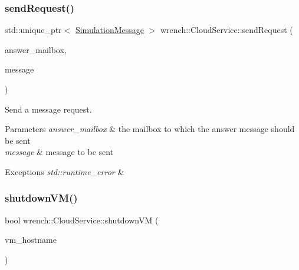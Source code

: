 \subsubsection{\texorpdfstring{send\+Request()}{sendRequest()}}
{\footnotesize\ttfamily std\+::unique\+\_\+ptr$<$ \hyperlink{classwrench_1_1_simulation_message}{Simulation\+Message} $>$ wrench\+::\+Cloud\+Service\+::send\+Request (\begin{DoxyParamCaption}\item[{std\+::string \&}]{answer\+\_\+mailbox,  }\item[{\hyperlink{classwrench_1_1_compute_service_message}{Compute\+Service\+Message} $\ast$}]{message }\end{DoxyParamCaption})\hspace{0.3cm}{\ttfamily [protected]}}



Send a message request. 


\begin{DoxyParams}{Parameters}
{\em answer\+\_\+mailbox} & the mailbox to which the answer message should be sent \\
\hline
{\em message} & message to be sent\\
\hline
\end{DoxyParams}

\begin{DoxyExceptions}{Exceptions}
{\em std\+::runtime\+\_\+error} & \\
\hline
\end{DoxyExceptions}
\mbox{\label{classwrench_1_1_cloud_service_ac9ee0c086c699c0c690be88abc7a0f9c}} 
\subsubsection{\texorpdfstring{shutdown\+V\+M()}{shutdownVM()}}
{\footnotesize\ttfamily bool wrench\+::\+Cloud\+Service\+::shutdown\+VM (\begin{DoxyParamCaption}\item[{const std\+::string \&}]{vm\+\_\+hostname }\end{DoxyParamCaption})\hspace{0.3cm}{\ttfamily [virtual]}}



